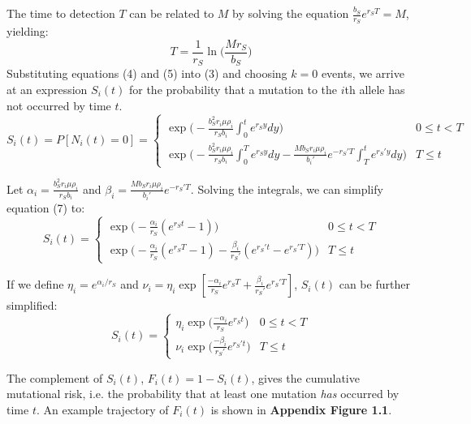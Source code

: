 \documentclass{article}
\begin{document}
The time to detection $T$ can be related to $M$ by solving the equation $\frac{b_S}{r_S}e^{r_ST}=M$, yielding:
\begin{equation}
T=\frac{1}{r_S}\ln\Big(\frac{Mr_S}{b_S}\Big)
\end{equation}
Substituting equations (4) and (5) into (3) and choosing $k=0$ events, we arrive at an expression $S_i(t)$ for the probability that a mutation to the $i$th allele has not occurred by time $t$.
\begin{equation}
S_i(t)=P[N_i(t)=0]  = \begin{cases} 
          \exp\Big(-\frac{b_S^2 r_i \mu \rho_i}{r_S b_i}\int_0^t e^{r_S y}dy\Big) & 0\leq t < T \\
          \exp\Big(-\frac{b_S^2 r_i \mu \rho_i}{r_S b_i}\int_0^T e^{r_S y}dy - \frac{M b_S r_i \mu \rho_i}{b_i'}e^{-r_S' T}\int_T^t e^{r_S'y}dy\Big) & T\leq t
       \end{cases}
\end{equation}

Let $\alpha_i = \frac{b_S^2 r_i \mu \rho_i}{r_S b_i}$ and $\beta_i = \frac{M b_S r_i \mu \rho_i}{b_i'}e^{-r_S' T}$.  Solving the integrals, we can simplify equation (7) to:
\begin{equation}
S_i(t)= \begin{cases} 
          \exp\Big(-\frac{\alpha_i}{r_S} (e^{r_S t}-1)\Big) & 0\leq t < T \\
          \exp\Big(-\frac{\alpha_i}{r_S} (e^{r_S T}-1) - \frac{\beta_i}{r_S'} (e^{r_S't}-e^{r_S'T})\Big) & T\leq t
       \end{cases}
\end{equation}

If we define $\eta_i = e^{\alpha_i /r_S}$ and $\nu_i = \eta_i \exp[\frac{-\alpha_i}{r_S} e^{r_S T}+\frac{\beta_i}{r_S'}e^{r_S' T}]$, $S_i(t)$ can be further simplified: 
\begin{equation}
S_i(t)= \begin{cases} 
		\eta_i \exp\Big(\frac{-\alpha_i}{r_S} e^{r_S t}\Big) & 0\leq t < T \\
		\nu_i \exp\Big(\frac{-\beta_i}{r_S'} e^{r_S' t}\Big) & T\leq t
       \end{cases}
\end{equation}


The complement of $S_i(t)$, $F_i(t)=1-S_i(t)$, gives the cumulative mutational risk, i.e. the probability that at least one mutation \textit{has} occurred by time $t$.  An example trajectory of $F_i(t)$ is shown in \textbf{Appendix Figure 1.1}.
\end{document}
